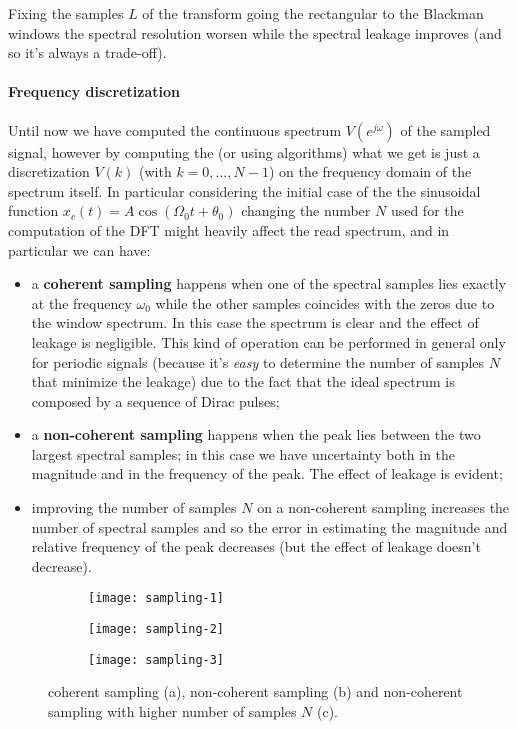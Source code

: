 	Fixing the samples $L$ of the transform going the rectangular to the Blackman windows the spectral resolution worsen while the spectral leakage improves (and so it's always a trade-off).	
	
	\paragraph{Frequency discretization} Until now we have computed the continuous spectrum $V(e^{j\omega})$ of the sampled signal, however by computing the \dft (or using \fft algorithms) what we get is just a discretization $V(k)$ (with $k =0,\dots,N-1$) on the frequency domain of the spectrum itself. In particular considering the initial case of the the sinusoidal function $x_c(t) = A \cos(\Omega_0 t + \theta_0)$ changing the number $N$ used for the computation of the DFT might heavily affect the read spectrum, and in particular we can have:
	\begin{itemize}
		\item a \textbf{coherent sampling} happens when one of the spectral samples lies exactly at the frequency $\omega_0$ while the other samples coincides with the zeros due to the window spectrum. In this case the spectrum is clear and the effect of leakage is negligible. This kind of operation can be performed in general only for periodic signals (because it's \textit{easy} to determine the number of samples $N$ that minimize the leakage) due to the fact that the ideal spectrum is composed by a sequence of Dirac pulses;
		\item a \textbf{non-coherent sampling} happens when the peak lies between the two largest spectral samples; in this case we have uncertainty both in the magnitude and in the frequency of the peak. The effect of leakage is evident;
		\item improving the number of samples $N$ on a non-coherent sampling increases the number of spectral samples and so the error in estimating the magnitude and relative frequency of the peak decreases (but the effect of leakage doesn't decrease). 
	\end{itemize}
	
	\begin{figure}[bht]
		\begin{subfigure}{0.32\linewidth}
			\centering \texttt{[image: sampling-1]} \caption{}
		\end{subfigure}
		\begin{subfigure}{0.32\linewidth}
			\centering \texttt{[image: sampling-2]} \caption{}
		\end{subfigure}
		\begin{subfigure}{0.32\linewidth}
			\centering \texttt{[image: sampling-3]} \caption{}
		\end{subfigure}
		\caption{coherent sampling (a), non-coherent sampling (b) and non-coherent sampling with higher number of samples $N$ (c).}
		\label{fig:dft:samplingvariation}
	\end{figure}
	
